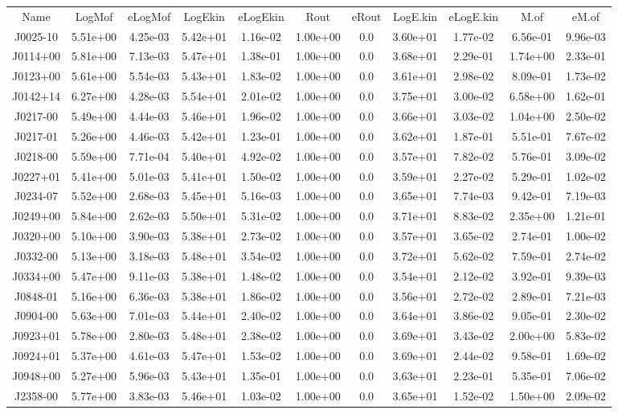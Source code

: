 \begin{table}
\begin{tabular}{ccccccccccc}
Name & LogMof & eLogMof & LogEkin & eLogEkin & Rout & eRout & LogE.kin & eLogE.kin & M.of & eM.of \\
J0025-10 & 5.51e+00 & 4.25e-03 & 5.42e+01 & 1.16e-02 & 1.00e+00 & 0.0 & 3.60e+01 & 1.77e-02 & 6.56e-01 & 9.96e-03 \\
J0114+00 & 5.81e+00 & 7.13e-03 & 5.47e+01 & 1.38e-01 & 1.00e+00 & 0.0 & 3.68e+01 & 2.29e-01 & 1.74e+00 & 2.33e-01 \\
J0123+00 & 5.61e+00 & 5.54e-03 & 5.43e+01 & 1.83e-02 & 1.00e+00 & 0.0 & 3.61e+01 & 2.98e-02 & 8.09e-01 & 1.73e-02 \\
J0142+14 & 6.27e+00 & 4.28e-03 & 5.54e+01 & 2.01e-02 & 1.00e+00 & 0.0 & 3.75e+01 & 3.00e-02 & 6.58e+00 & 1.62e-01 \\
J0217-00 & 5.49e+00 & 4.44e-03 & 5.46e+01 & 1.96e-02 & 1.00e+00 & 0.0 & 3.66e+01 & 3.03e-02 & 1.04e+00 & 2.50e-02 \\
J0217-01 & 5.26e+00 & 4.46e-03 & 5.42e+01 & 1.23e-01 & 1.00e+00 & 0.0 & 3.62e+01 & 1.87e-01 & 5.51e-01 & 7.67e-02 \\
J0218-00 & 5.59e+00 & 7.71e-04 & 5.40e+01 & 4.92e-02 & 1.00e+00 & 0.0 & 3.57e+01 & 7.82e-02 & 5.76e-01 & 3.09e-02 \\
J0227+01 & 5.41e+00 & 5.01e-03 & 5.41e+01 & 1.50e-02 & 1.00e+00 & 0.0 & 3.59e+01 & 2.27e-02 & 5.29e-01 & 1.02e-02 \\
J0234-07 & 5.52e+00 & 2.68e-03 & 5.45e+01 & 5.16e-03 & 1.00e+00 & 0.0 & 3.65e+01 & 7.74e-03 & 9.42e-01 & 7.19e-03 \\
J0249+00 & 5.84e+00 & 2.62e-03 & 5.50e+01 & 5.31e-02 & 1.00e+00 & 0.0 & 3.71e+01 & 8.83e-02 & 2.35e+00 & 1.21e-01 \\
J0320+00 & 5.10e+00 & 3.90e-03 & 5.38e+01 & 2.73e-02 & 1.00e+00 & 0.0 & 3.57e+01 & 3.65e-02 & 2.74e-01 & 1.00e-02 \\
J0332-00 & 5.13e+00 & 3.18e-03 & 5.48e+01 & 3.54e-02 & 1.00e+00 & 0.0 & 3.72e+01 & 5.62e-02 & 7.59e-01 & 2.74e-02 \\
J0334+00 & 5.47e+00 & 9.11e-03 & 5.38e+01 & 1.48e-02 & 1.00e+00 & 0.0 & 3.54e+01 & 2.12e-02 & 3.92e-01 & 9.39e-03 \\
J0848-01 & 5.16e+00 & 6.36e-03 & 5.38e+01 & 1.86e-02 & 1.00e+00 & 0.0 & 3.56e+01 & 2.72e-02 & 2.89e-01 & 7.21e-03 \\
J0904-00 & 5.63e+00 & 7.01e-03 & 5.44e+01 & 2.40e-02 & 1.00e+00 & 0.0 & 3.64e+01 & 3.86e-02 & 9.05e-01 & 2.30e-02 \\
J0923+01 & 5.78e+00 & 2.80e-03 & 5.48e+01 & 2.38e-02 & 1.00e+00 & 0.0 & 3.69e+01 & 3.43e-02 & 2.00e+00 & 5.83e-02 \\
J0924+01 & 5.37e+00 & 4.61e-03 & 5.47e+01 & 1.53e-02 & 1.00e+00 & 0.0 & 3.69e+01 & 2.44e-02 & 9.58e-01 & 1.69e-02 \\
J0948+00 & 5.27e+00 & 5.96e-03 & 5.43e+01 & 1.35e-01 & 1.00e+00 & 0.0 & 3.63e+01 & 2.23e-01 & 5.35e-01 & 7.06e-02 \\
J2358-00 & 5.77e+00 & 3.83e-03 & 5.46e+01 & 1.03e-02 & 1.00e+00 & 0.0 & 3.65e+01 & 1.52e-02 & 1.50e+00 & 2.09e-02 \\
\end{tabular}
\end{table}
